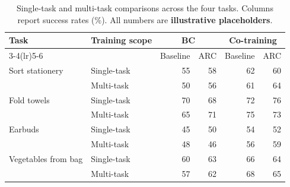 \begin{table}[htbp]
  \centering
  \caption{Single-task and multi-task comparisons across the four tasks. Columns report success rates (\%). All numbers are \textbf{illustrative placeholders}.}
  \label{tab:task-training-comparison}
  \small
  \setlength{\tabcolsep}{4pt}
  \renewcommand{\arraystretch}{1.1}
  \begin{tabular}{@{}llrrrr@{}}
    \toprule
    Task & Training scope & \multicolumn{2}{c}{BC} & \multicolumn{2}{c}{Co-training} \\
    \cmidrule(lr){3-4}\cmidrule(lr){5-6}
     & & Baseline & ARC & Baseline & ARC \\
    \midrule
    Sort stationery & Single-task & 55 & 58 & 62 & 60 \\
     & Multi-task & 50 & 56 & 61 & 64 \\
    \addlinespace[3pt]
    Fold towels & Single-task & 70 & 68 & 72 & 76 \\
     & Multi-task & 65 & 71 & 75 & 73 \\
    \addlinespace[3pt]
    Earbuds & Single-task & 45 & 50 & 54 & 52 \\
     & Multi-task & 48 & 46 & 56 & 59 \\
    \addlinespace[3pt]
    Vegetables from bag & Single-task & 60 & 63 & 66 & 64 \\
     & Multi-task & 57 & 62 & 68 & 65 \\
    \bottomrule
  \end{tabular}
\end{table}
